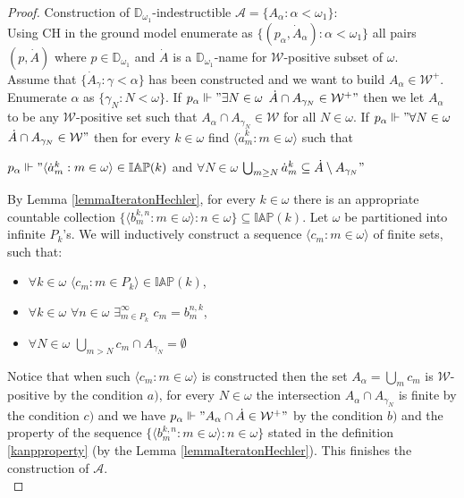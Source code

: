 \documentclass[a4paper]{amsart}
\newcommand{\WANDER}{\mathcal{W}}
\newcommand{\IAP}{\mathbb{IAP}}
\begin{document}
\begin{proof}
    Construction of $\mathbb{D}_{\omega_{1}}$-indestructible $\mathcal{A}=\{A_{\alpha}:\alpha<\omega_{1}\}$:\\
    Using CH in the ground model enumerate as $\{(p_{\alpha},\dot{A}_{\alpha}):\alpha<\omega_{1}\}$ all pairs $(p,\dot{A})$ where $p\in\mathbb{D}_{\omega_{1}}$ and $\dot{A}$ is a $\mathbb{D}_{\omega_{1}}$-name for $\WANDER$-positive subset of $\omega$.\\
    Assume that $\{\dot{A}_{\gamma}:\gamma<\alpha\}$ has been constructed and we want to build $A_{\alpha}\in\WANDER^{+}$. Enumerate $\alpha$ as $\{\gamma_{N}:N<\omega\}$. If $p_{\alpha}\Vdash"\exists N\in\omega$ $\dot{A}\cap A_{\gamma_{N}}\in\WANDER^{+}"$ then we let $A_{\alpha}$ to be any $\WANDER$-positive set such that $A_{\alpha}\cap A_{\gamma_{N}}\in\WANDER$ for all $N\in\omega$. If  $p_{\alpha}\Vdash"\forall N\in\omega$ $\dot{A}\cap A_{\gamma_{N}}\in\WANDER"$ then for every $k\in\omega$ find $\langle\dot{a}^{k}_{m}:m\in\omega\rangle$ such that 
    \begin{center}
    $p_{\alpha}\Vdash"\langle\dot{a}^{k}_{m}:m\in\omega\rangle\in\IAP(k)$ and $\forall N\in\omega$ $\bigcup_{m\geq N}\dot{a}^{k}_{m}\subseteq\dot{A}\setminus A_{\gamma_{N}}"$
    \end{center}
    By Lemma \ref{lemmaIteratonHechler}, for every $k\in\omega$ there is an appropriate countable collection $\{\langle b^{k,n}_{m}:m\in\omega\rangle:n\in\omega\}\subseteq\IAP(k)$. Let $\omega$ be partitioned into infinite $P_{k}$'s. We will inductively construct a sequence $\langle c_{m}:m\in\omega\rangle$ of finite sets, such that:
    \begin{itemize}
        \item[$a)$] $\forall k\in\omega$ $\langle c_{m}:m\in P_{k}\rangle\in\IAP(k)$,
        \item[$b)$] $\forall k\in\omega$ $\forall n\in\omega$ $\exists^{\infty}_{m\in P_{k}}$ $c_{m}=b^{n,k}_{m}$,
        \item[$c)$] $\forall N\in\omega$ $\bigcup_{m>N}c_{m}\cap A_{\gamma_{N}}=\emptyset$
    \end{itemize}
    Notice that when such $\langle c_{m}:m\in\omega\rangle$ is constructed then the set $A_{\alpha}=\bigcup_{m}c_{m}$ is $\WANDER$-positive by the condition $a)$, for every $N\in\omega$ the intersection $A_{\alpha}\cap A_{\gamma_{N}}$ is finite by the condition $c)$ and we have $p_{\alpha}\Vdash"A_{\alpha}\cap \dot{A}\in\WANDER^{+}"$ by the condition $b)$ and the property of the sequence $\{\langle b^{k,n}_{m}:m\in\omega\rangle:n\in\omega\}$ stated in the definition \ref{kanpproperty} (by the Lemma \ref{lemmaIteratonHechler}). This finishes the construction of $\mathcal{A}$.\\
    

\end{proof}
\end{document}
